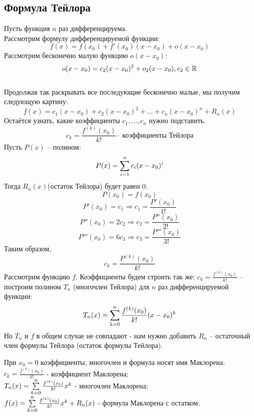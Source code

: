 \subsection{Формула Тейлора}
Пусть функция \( n \) раз дифференцируема. \\
Рассмотрим формулу дифференцируемой функции:
\[ f(x) = f(x_0) + f'(x_0)(x-x_0) + o(x-x_0) \]
Рассмотрим бесконечно малую функцию \( o(x-x_0) \):
\[ o(x-x_0) = c_2(x-x_0)^2 + o_2(x-x_0), c_2 \in \mathbb{R} \]
 \\ 
Продолжая так раскрывать все последующие бесконечно малые, мы получим следующую картину:
\[ f(x) = c_1(x-x_0)+c_2(x-x_0)^2+\dots+c_n(x-x_0)^n+R_n(x) \]
Остаётся узнать, какие коэффициенты \( c_{1}, \dots, c_{n} \) нужно подставить. \\ 
\[ c_k = \frac{f^{(k)}(x_0)}{k!} \text{-- коэффициенты Тейлора} \]
Пусть \( P(x) \) -- полином: 
\[ P(x) = \sum \limits_{i=1}^{n} {c_i(x-x_0)^i} \]
Тогда \( R_n(x) \)(остаток Тейлора) будет равен \( 0 \).
\[ P(x_0) = f(x_0) \]
\[ P'(x_0) = c_1 \Longrightarrow c_1 = \frac{P'(x_0)}{1!} \]
\[ P''(x_0) = 2c_2 \Longrightarrow c_2 = \frac{P''(x_0)}{2!} \]
\[ P'''(x_0) = 6c_3 \Longrightarrow c_3 = \frac{P'''(x_0)}{3!} \]
Таким образом, \[ c_k = \frac{P^{(k)}(x_0)}{k!} \]
Рассмотрим функцию \( f \). Коэффициенты будем строить так же: \( c_k  = \frac{f^{(k)}(x_0)}{k!}\) -- построим полином \( T_n \) (многочлен Тейлора) для \( n \) раз дифференцируемой функции:
\[ T_n(x) = \sum \limits_{k=0}^{n} {\frac{f^{(k)}(x_0)}{k!}(x-x_0)^k} \]
Но \( T_n \) и \( f \) в общем случае не совпадают - нам нужно добавить \( R_n \) -- остаточный член формулы Тейлора (остаток формулы Тейлора).
\begin{note} 
    При \(x_0 = 0\) коэффициенты, многочлен и формула носят имя Маклорена:
    \( c_k  = \frac{f^{(k)}(x_0)}{k!} \) - коэффициент Маклорена; \\
    \( T_n(x) = \sum \limits_{k=0}^{n} {\frac{f^{(k)}(x_0)}{k!}x^k} \) - многочлен Маклорена; \\
    \( f(x) = \sum \limits_{k=0}^{n} {\frac{f^{(k)}(x_0)}{k!}x^k + R_n(x)}\) - формула Маклорена с остатком; \\
\end{note}